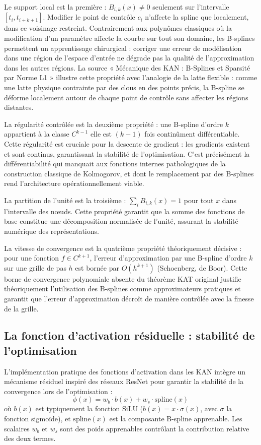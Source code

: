 \documentclass[11pt,a4paper,oneside]{report}
\theoremstyle{definition}
\theoremstyle{remark}
\begin{document}
Le support local est la première : $B_{i,k}(x) \neq 0$ seulement sur l'intervalle $[t_i, t_{i+k+1}]$. Modifier le point de contrôle $c_i$ n'affecte la spline que localement, dans ce voisinage restreint. Contrairement aux polynômes classiques où la modification d'un paramètre affecte la courbe sur tout son domaine, les B-splines permettent un apprentissage chirurgical : corriger une erreur de modélisation dans une région de l'espace d'entrée ne dégrade pas la qualité de l'approximation dans les autres régions. La source « Mécanique des KAN : B-Splines et Sparsité par Norme L1 » illustre cette propriété avec l'analogie de la latte flexible : comme une latte physique contrainte par des clous en des points précis, la B-spline se déforme localement autour de chaque point de contrôle sans affecter les régions distantes.

La régularité contrôlée est la deuxième propriété : une B-spline d'ordre $k$ appartient à la classe $C^{k-1}$  elle est $(k-1)$ fois continûment différentiable. Cette régularité est cruciale pour la descente de gradient : les gradients existent et sont continus, garantissant la stabilité de l'optimisation. C'est précisément la différentiabilité qui manquait aux fonctions internes pathologiques de la construction classique de Kolmogorov, et dont le remplacement par des B-splines rend l'architecture opérationnellement viable.

La partition de l'unité est la troisième : $\sum_i B_{i,k}(x) = 1$ pour tout $x$ dans l'intervalle des nœuds. Cette propriété garantit que la somme des fonctions de base constitue une décomposition normalisée de l'unité, assurant la stabilité numérique des représentations.

La vitesse de convergence est la quatrième propriété théoriquement décisive : pour une fonction $f \in C^{k+1}$, l'erreur d'approximation par une B-spline d'ordre $k$ sur une grille de pas $h$ est bornée par $O(h^{k+1})$ (Schoenberg, de Boor). Cette borne de convergence polynomiale  absente du théorème KAT original  justifie théoriquement l'utilisation des B-splines comme approximateurs pratiques et garantit que l'erreur d'approximation décroît de manière contrôlée avec la finesse de la grille.

\subsection{La fonction d'activation résiduelle : stabilité de l'optimisation}

L'implémentation pratique des fonctions d'activation dans les KAN intègre un mécanisme résiduel inspiré des réseaux ResNet pour garantir la stabilité de la convergence lors de l'optimisation :
\begin{equation}
\phi(x) = w_b \cdot b(x) + w_s \cdot \text{spline}(x)
\end{equation}
où $b(x)$ est typiquement la fonction SiLU ($b(x) = x \cdot \sigma(x)$, avec $\sigma$ la fonction sigmoïde), et $\text{spline}(x)$ est la composante B-spline apprenable. Les scalaires $w_b$ et $w_s$ sont des poids apprenables contrôlant la contribution relative des deux termes.
\end{document}
